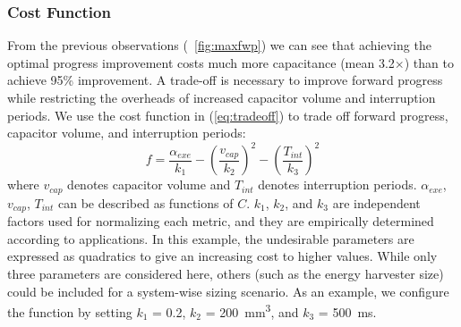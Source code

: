 
\subsubsection{Cost Function}

From the previous observations (\figurename{~\ref{fig:maxfwp}}) we can see that achieving the optimal progress improvement costs much more capacitance (mean 3.2$\times$) than to achieve 95\% improvement. A trade-off is necessary to improve forward progress while restricting the overheads of increased capacitor volume and interruption periods. We use the cost function in (\ref{eq:tradeoff}) to trade off forward progress, capacitor volume, and interruption periods: 
\begin{equation}
    f = \frac{\alpha_{exe}}{k_1} - \left(\frac{v_{cap}}{k_2}\right) ^ {2} - \left(\frac{T_{int}}{k_3}\right) ^ {2} 
    \label{eq:tradeoff}
\end{equation}
where $v_{cap}$ denotes capacitor volume and $T_{int}$ denotes interruption periods. $\alpha_{exe}$, $v_{cap}$, $T_{int}$ can be described as functions of $C$. $k_1$, $k_2$, and $k_3$ are independent factors used for normalizing each metric, and they are empirically determined according to applications. In this example, the undesirable parameters are expressed as quadratics to give an increasing cost to higher values. While only three parameters are considered here, others (such as the energy harvester size) could be included for a system-wise sizing scenario.
As an example, we configure the function by setting $k_1$ = 0.2, $k_2$ = \SI{200}{\cubic\milli\meter}, and $k_3$ = \SI{500}{\milli\second}. 

